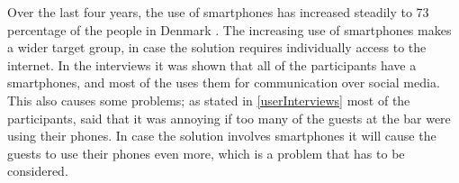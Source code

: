 Over the last four years, the use of smartphones has increased steadily to 73 percentage of the people in Denmark \cite{smartphone2014}. The increasing use of smartphones makes a wider target group, in case the solution requires individually access to the internet. In the interviews it was shown that all of the participants have a smartphones, and most of the uses them for communication over social media. This also causes some problems; as stated in \cref{userInterviews} most of the participants, said that it was annoying if too many of the guests at the bar were using their phones. In case the solution involves smartphones it will cause the guests to use their phones even more, which is a problem that has to be considered.


